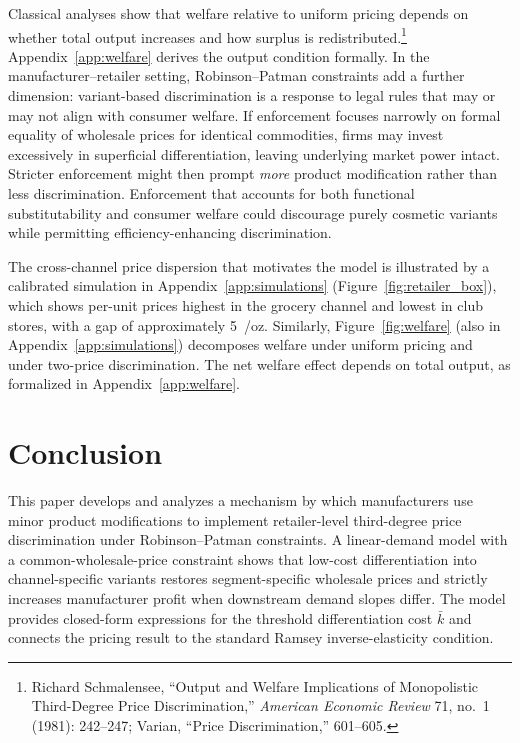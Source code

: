 \documentclass[12pt]{article}
\theoremstyle{definition}
\begin{document}
Classical analyses show that welfare relative to uniform pricing depends on whether total output increases and how surplus is redistributed.\footnote{Richard Schmalensee, ``Output and Welfare Implications of Monopolistic Third-Degree Price Discrimination,'' \textit{American Economic Review} 71, no.~1 (1981): 242--247; Varian, ``Price Discrimination,'' 601--605.}
Appendix~\ref{app:welfare} derives the output condition formally.
In the manufacturer--retailer setting, Robinson--Patman constraints add a further dimension: variant-based discrimination is a response to legal rules that may or may not align with consumer welfare.
If enforcement focuses narrowly on formal equality of wholesale prices for identical commodities, firms may invest excessively in superficial differentiation, leaving underlying market power intact.
Stricter enforcement might then prompt \textit{more} product modification rather than less discrimination.
Enforcement that accounts for both functional substitutability and consumer welfare could discourage purely cosmetic variants while permitting efficiency-enhancing discrimination.

The cross-channel price dispersion that motivates the model is illustrated by a calibrated simulation in Appendix~\ref{app:simulations} (Figure~\ref{fig:retailer_box}), which shows per-unit prices highest in the grocery channel and lowest in club stores, with a gap of approximately 5~\textcent/oz.
Similarly, Figure~\ref{fig:welfare} (also in Appendix~\ref{app:simulations}) decomposes welfare under uniform pricing and under two-price discrimination. The net welfare effect depends on total output, as formalized in Appendix~\ref{app:welfare}.


\section{Conclusion}\label{sec:conclusion}

This paper develops and analyzes a mechanism by which manufacturers use minor product modifications to implement retailer-level third-degree price discrimination under Robinson--Patman constraints.
A linear-demand model with a common-wholesale-price constraint shows that low-cost differentiation into channel-specific variants restores segment-specific wholesale prices and strictly increases manufacturer profit when downstream demand slopes differ.
The model provides closed-form expressions for the threshold differentiation cost $\bar{k}$ and connects the pricing result to the standard Ramsey inverse-elasticity condition.
\end{document}
